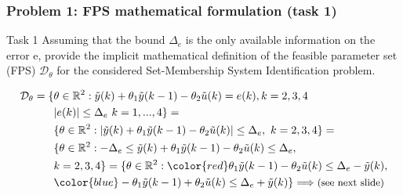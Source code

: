 \documentclass{beamer}
\begin{document}
\begin{frame}
    \frametitle{Problem 1: FPS mathematical formulation (task 1)}
    \begin{alertblock}{Task 1}
        \justifying
        {Assuming that the bound $\Delta_e$ is the only available information on the error e, provide the implicit mathematical definition of the feasible parameter set (FPS) $\mathcal{D}_\theta$ for the considered Set-Membership System Identification problem.}
    \end{alertblock}
    \begin{equation}
        \begin{aligned}
            \mathcal{D}_\theta=\{
                &\theta\in\mathbb{R}^2: \tilde{y}(k)+\theta_1\tilde{y}(k-1)-\theta_2{\tilde{u}(k)}=e(k), k=2,3,4\\
                &\vert e(k) \vert \le \Delta_e \ k=1,...,4 
            \}=\\
            &\{
                \theta \in \mathbb{R}^2: \vert \tilde{y}(k)+\theta_1\tilde{y}(k-1)-\theta_2{\tilde{u}(k)} \vert \le \Delta_e, \ k=2,3,4
            \}=\\
            &\{
                \theta \in \mathbb{R}^2: -\Delta_e \le \tilde{y}(k)+\theta_1\tilde{y}(k-1)-\theta_2{\tilde{u}(k)} \le \Delta_e, \\ &k=2,3,4
            \}=\{
                \theta\in\mathbb{R}^2: 
                {\color{red}\theta_1\tilde{y}(k-1)-\theta_2{\tilde{u}(k)} \le \Delta_e -\tilde{y}(k)},\\
                &{\color{blue}-\theta_1\tilde{y}(k-1)+\theta_2{\tilde{u}(k)} \le \Delta_e +\tilde{y}(k)}
            \} \Longrightarrow \text{\small(see next slide)}
        \end{aligned}
    \end{equation}
\end{frame}
\end{document}
